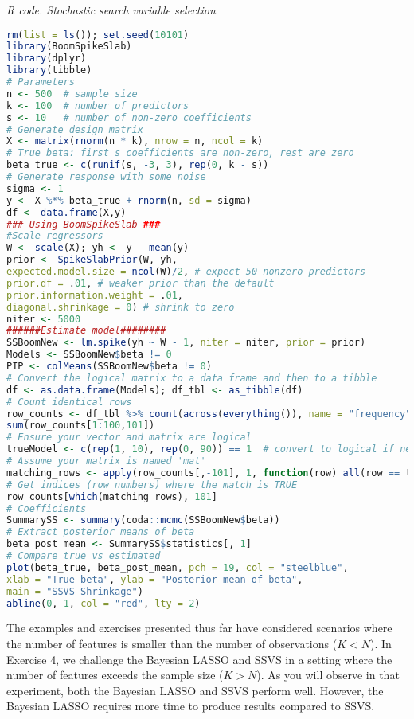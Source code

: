 \begin{tcolorbox}[enhanced,width=4.67in,center upper,
	fontupper=\large\bfseries,drop shadow southwest,sharp corners]
	\textit{R code. Stochastic search variable selection}
	\begin{VF}
		\begin{lstlisting}[language=R]
rm(list = ls()); set.seed(10101)
library(BoomSpikeSlab)
library(dplyr)
library(tibble)
# Parameters
n <- 500  # sample size
k <- 100  # number of predictors
s <- 10   # number of non-zero coefficients
# Generate design matrix
X <- matrix(rnorm(n * k), nrow = n, ncol = k)
# True beta: first s coefficients are non-zero, rest are zero
beta_true <- c(runif(s, -3, 3), rep(0, k - s))
# Generate response with some noise
sigma <- 1
y <- X %*% beta_true + rnorm(n, sd = sigma)
df <- data.frame(X,y)
### Using BoomSpikeSlab ###
#Scale regressors
W <- scale(X); yh <- y - mean(y)
prior <- SpikeSlabPrior(W, yh, 
expected.model.size = ncol(W)/2, # expect 50 nonzero predictors
prior.df = .01, # weaker prior than the default
prior.information.weight = .01,
diagonal.shrinkage = 0) # shrink to zero
niter <- 5000
######Estimate model########
SSBoomNew <- lm.spike(yh ~ W - 1, niter = niter, prior = prior)
Models <- SSBoomNew$beta != 0
PIP <- colMeans(SSBoomNew$beta != 0)
# Convert the logical matrix to a data frame and then to a tibble
df <- as.data.frame(Models); df_tbl <- as_tibble(df)
# Count identical rows
row_counts <- df_tbl %>% count(across(everything()), name = "frequency") %>% arrange(desc(frequency))
sum(row_counts[1:100,101])
# Ensure your vector and matrix are logical
trueModel <- c(rep(1, 10), rep(0, 90)) == 1  # convert to logical if needed
# Assume your matrix is named 'mat'
matching_rows <- apply(row_counts[,-101], 1, function(row) all(row == trueModel))
# Get indices (row numbers) where the match is TRUE
row_counts[which(matching_rows), 101]
# Coefficients
SummarySS <- summary(coda::mcmc(SSBoomNew$beta))
# Extract posterior means of beta
beta_post_mean <- SummarySS$statistics[, 1]
# Compare true vs estimated
plot(beta_true, beta_post_mean, pch = 19, col = "steelblue",
xlab = "True beta", ylab = "Posterior mean of beta",
main = "SSVS Shrinkage")
abline(0, 1, col = "red", lty = 2)
\end{lstlisting}
	\end{VF}
\end{tcolorbox}

The examples and exercises presented thus far have considered scenarios where the number of features is smaller than the number of observations ($K < N$). In Exercise 4, we challenge the Bayesian LASSO and SSVS in a setting where the number of features exceeds the sample size ($K > N$). As you will observe in that experiment, both the Bayesian LASSO and SSVS perform well. However, the Bayesian LASSO requires more time to produce results compared to SSVS.

